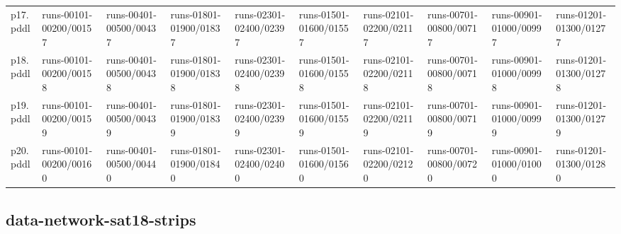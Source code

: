 \documentclass{article}
\begin{document}
\begin{tabular}{@{}lrrrrrrrrr@{}}
p17.pddl & \multicolumn{1}{|l|}{runs-00101-00200/00157} & \multicolumn{1}{|l|}{runs-00401-00500/00437} & \multicolumn{1}{|l|}{runs-01801-01900/01837} & \multicolumn{1}{|l|}{runs-02301-02400/02397} & \multicolumn{1}{|l|}{runs-01501-01600/01557} & \multicolumn{1}{|l|}{runs-02101-02200/02117} & \multicolumn{1}{|l|}{runs-00701-00800/00717} & \multicolumn{1}{|l|}{runs-00901-01000/00997} & \multicolumn{1}{|l|}{runs-01201-01300/01277} \\
p18.pddl & \multicolumn{1}{|l|}{runs-00101-00200/00158} & \multicolumn{1}{|l|}{runs-00401-00500/00438} & \multicolumn{1}{|l|}{runs-01801-01900/01838} & \multicolumn{1}{|l|}{runs-02301-02400/02398} & \multicolumn{1}{|l|}{runs-01501-01600/01558} & \multicolumn{1}{|l|}{runs-02101-02200/02118} & \multicolumn{1}{|l|}{runs-00701-00800/00718} & \multicolumn{1}{|l|}{runs-00901-01000/00998} & \multicolumn{1}{|l|}{runs-01201-01300/01278} \\
p19.pddl & \multicolumn{1}{|l|}{runs-00101-00200/00159} & \multicolumn{1}{|l|}{runs-00401-00500/00439} & \multicolumn{1}{|l|}{runs-01801-01900/01839} & \multicolumn{1}{|l|}{runs-02301-02400/02399} & \multicolumn{1}{|l|}{runs-01501-01600/01559} & \multicolumn{1}{|l|}{runs-02101-02200/02119} & \multicolumn{1}{|l|}{runs-00701-00800/00719} & \multicolumn{1}{|l|}{runs-00901-01000/00999} & \multicolumn{1}{|l|}{runs-01201-01300/01279} \\
p20.pddl & \multicolumn{1}{|l|}{runs-00101-00200/00160} & \multicolumn{1}{|l|}{runs-00401-00500/00440} & \multicolumn{1}{|l|}{runs-01801-01900/01840} & \multicolumn{1}{|l|}{runs-02301-02400/02400} & \multicolumn{1}{|l|}{runs-01501-01600/01560} & \multicolumn{1}{|l|}{runs-02101-02200/02120} & \multicolumn{1}{|l|}{runs-00701-00800/00720} & \multicolumn{1}{|l|}{runs-00901-01000/01000} & \multicolumn{1}{|l|}{runs-01201-01300/01280} \\
\end{tabular}

\hypertarget{run_dir-data-network-sat18-strips}{}
\subsection*{data-network-sat18-strips}
\end{document}
